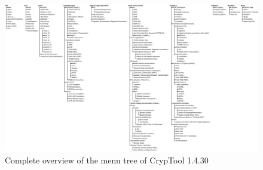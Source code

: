 

\clearpage
\begin{figure}[hb]
\begin{center}
\vspace{-30pt}
\includegraphics[scale=0.35, angle=270]
                {figures/cryptool-menu-en}
\caption{Complete overview of the menu tree of CrypTool 1.4.30} 
\label{menuoverview}
\end{center}
\end{figure}
\clearpage
